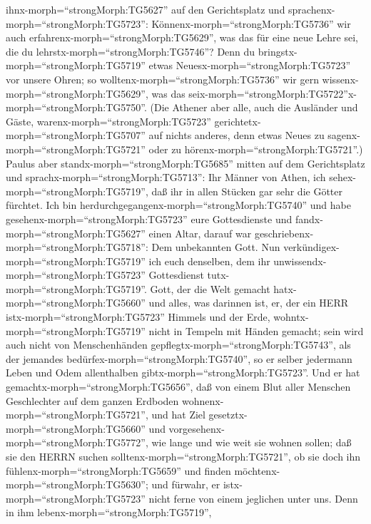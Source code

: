 ihnx-morph=``strongMorph:TG5627'' auf den Gerichtsplatz und
sprachenx-morph=``strongMorph:TG5723'':
Könnenx-morph=``strongMorph:TG5736'' wir auch
erfahrenx-morph=``strongMorph:TG5629'', was das für eine neue Lehre sei,
die du lehrstx-morph=``strongMorph:TG5746''?  Denn du
bringstx-morph=``strongMorph:TG5719'' etwas
Neuesx-morph=``strongMorph:TG5723'' vor unsere Ohren; so
wolltenx-morph=``strongMorph:TG5736'' wir gern
wissenx-morph=``strongMorph:TG5629'', was das
seix-morph=``strongMorph:TG5722''x-morph=``strongMorph:TG5750''.
 (Die Athener aber alle, auch die Ausländer und Gäste,
warenx-morph=``strongMorph:TG5723''
gerichtetx-morph=``strongMorph:TG5707'' auf nichts anderes, denn etwas
Neues zu sagenx-morph=``strongMorph:TG5721'' oder zu
hörenx-morph=``strongMorph:TG5721''.)  Paulus aber
standx-morph=``strongMorph:TG5685'' mitten auf dem Gerichtsplatz und
sprachx-morph=``strongMorph:TG5713'': Ihr Männer von Athen, ich
sehex-morph=``strongMorph:TG5719'', daß ihr in allen Stücken gar sehr
die Götter fürchtet.  Ich bin
herdurchgegangenx-morph=``strongMorph:TG5740'' und habe
gesehenx-morph=``strongMorph:TG5723'' eure Gottesdienste und
fandx-morph=``strongMorph:TG5627'' einen Altar, darauf war
geschriebenx-morph=``strongMorph:TG5718'': Dem unbekannten Gott. Nun
verkündigex-morph=``strongMorph:TG5719'' ich euch denselben, dem ihr
unwissendx-morph=``strongMorph:TG5723'' Gottesdienst
tutx-morph=``strongMorph:TG5719''.  Gott, der die Welt
gemacht hatx-morph=``strongMorph:TG5660'' und alles, was darinnen ist,
er, der ein HERR istx-morph=``strongMorph:TG5723'' Himmels und der Erde,
wohntx-morph=``strongMorph:TG5719'' nicht in Tempeln mit Händen gemacht;
 sein wird auch nicht von Menschenhänden
gepflegtx-morph=``strongMorph:TG5743'', als der jemandes
bedürfex-morph=``strongMorph:TG5740'', so er selber jedermann Leben und
Odem allenthalben gibtx-morph=``strongMorph:TG5723''.  Und
er hat gemachtx-morph=``strongMorph:TG5656'', daß von einem Blut aller
Menschen Geschlechter auf dem ganzen Erdboden
wohnenx-morph=``strongMorph:TG5721'', und hat Ziel
gesetztx-morph=``strongMorph:TG5660'' und
vorgesehenx-morph=``strongMorph:TG5772'', wie lange und wie weit sie
wohnen sollen;  daß sie den HERRN suchen
solltenx-morph=``strongMorph:TG5721'', ob sie doch ihn
fühlenx-morph=``strongMorph:TG5659'' und finden
möchtenx-morph=``strongMorph:TG5630''; und fürwahr, er
istx-morph=``strongMorph:TG5723'' nicht ferne von einem jeglichen unter
uns.  Denn in ihm lebenx-morph=``strongMorph:TG5719'',
